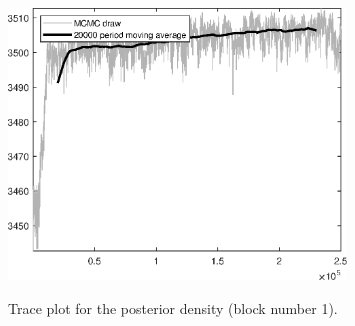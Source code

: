 \begin{figure}[H]
\centering
  \includegraphics[width=0.8\textwidth]{directed_search/graphs/TracePlot_Posterior_blck_1}\\
    \caption{Trace plot for the posterior density (block number 1).}
\end{figure}
